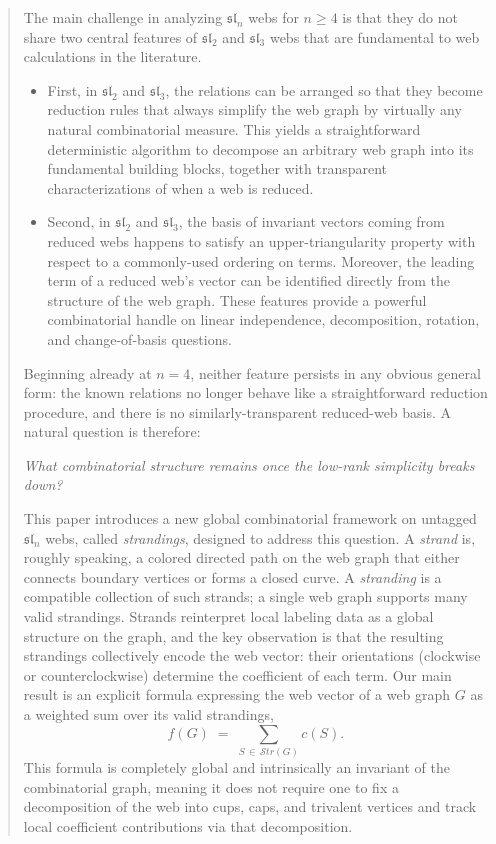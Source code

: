\documentclass[letterpaper,11pt]{amsart}
\begin{document}
\begin{abstract}
The main challenge in analyzing $\mathfrak{sl}_n$ webs for $n\geq 4$ is that they do not share two central features of $\mathfrak{sl}_2$ and $\mathfrak{sl}_3$ webs that are fundamental to web calculations in the literature.
\begin{itemize}
    \item First, in $\mathfrak{sl}_2$ and $\mathfrak{sl}_3$, the relations can be arranged so that they become reduction rules that always simplify the web graph by virtually any natural combinatorial measure. This yields a straightforward deterministic algorithm to decompose an arbitrary web graph into its fundamental building blocks, 
    together with transparent characterizations of when a web is reduced.
    \item Second, in $\mathfrak{sl}_2$ and $\mathfrak{sl}_3$, the basis of invariant vectors coming from reduced webs happens to satisfy 
    an upper-triangularity property with respect to a commonly-used 
    ordering on terms. Moreover, the leading term of a reduced web's vector can be identified directly from the structure of the web graph. These features provide a powerful combinatorial handle on linear independence, decomposition, rotation, and change-of-basis questions.
\end{itemize}
Beginning already at $n=4$, neither feature persists in any obvious general form: the known relations no longer behave like a straightforward reduction procedure, and there is no similarly-transparent reduced-web basis. A natural question is therefore: 
\begin{tcolorbox}[boxrule=0.4pt, colback=white, colframe=black]
\begin{center}
    \emph{What combinatorial structure remains once the low-rank simplicity breaks down?}
\end{center}
\end{tcolorbox}
 
 
This paper introduces a new global combinatorial framework on untagged $\mathfrak{sl}_n$ webs, called \emph{strandings}, designed to address this question. A \emph{strand} is, roughly speaking, a colored directed path on the web graph that either connects boundary vertices or forms a closed curve. A \emph{stranding} is a compatible collection of such strands; a single web graph supports many valid strandings. Strands reinterpret local labeling data as a global structure on the graph, and the key observation is that the resulting strandings collectively encode the web vector: their orientations (clockwise or counterclockwise) determine the coefficient of each term. Our main result is an explicit formula expressing the web vector of a web graph $G$ as a weighted sum over its valid strandings,
\[
    f(G) \;=\; \sum_{S \,\in\, \mathcal{S}tr(G)} c(S).
\]
This formula is completely global and intrinsically an invariant of the combinatorial graph, meaning it does not require one to fix a decomposition of the web into cups, caps, and trivalent vertices and track local coefficient contributions via that decomposition.
 

\end{abstract}
\end{document}
